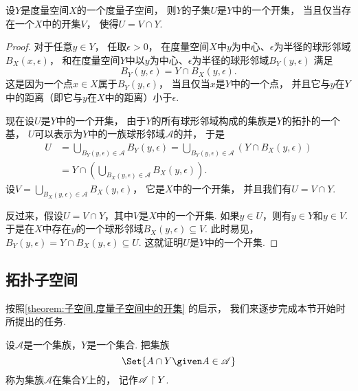 \begin{theorem}\label{theorem:子空间.度量子空间中的开集}
设\(Y\)是度量空间\(X\)的一个度量子空间，
则\(Y\)的子集\(U\)是\(Y\)中的一个开集，
当且仅当存在一个\(X\)中的开集\(V\)，
使得\(U = V \cap Y\).
\begin{proof}
对于任意\(y \in Y\)，
任取\(\epsilon>0\)，
在度量空间\(X\)中\(y\)为中心、\(\epsilon\)为半径的球形邻域\(B_X(x,\epsilon)\)，
和在度量空间\(Y\)中以\(y\)为中心、\(\epsilon\)为半径的球形邻域\(B_Y(y,\epsilon)\)
满足\begin{equation*}
	B_Y(y,\epsilon)
	= Y \cap B_X(y,\epsilon).
\end{equation*}
这是因为一个点\(x \in X\)属于\(B_Y(y,\epsilon)\)，
当且仅当\(x\)是\(Y\)中的一个点，
并且它与\(y\)在\(Y\)中的距离（即它与\(y\)在\(X\)中的距离）小于\(\epsilon\).

现在设\(U\)是\(Y\)中的一个开集，
由于\(Y\)的所有球形邻域构成的集族是\(Y\)的拓扑的一个基，
\(U\)可以表示为\(Y\)中的一族球形邻域\(\mathscr{A}\)的并，
于是\begin{align*}
	U &= \bigcup_{B_Y(y,\epsilon) \in \mathscr{A}} B_Y(y,\epsilon)
	= \bigcup_{B_Y(y,\epsilon) \in \mathscr{A}} \left( Y \cap B_X(y,\epsilon) \right) \\
	&= Y \cap \left( \bigcup_{B_X(y,\epsilon) \in \mathscr{A}} B_X(y,\epsilon) \right).
\end{align*}
设\(V = \bigcup_{B_X(y,\epsilon) \in \mathscr{A}} B_X(y,\epsilon)\)，
它是\(X\)中的一个开集，
并且我们有\(U = V \cap Y\).

反过来，假设\(U = V \cap Y\)，其中\(V\)是\(X\)中的一个开集.
如果\(y \in U\)，则有\(y \in Y\)和\(y \in V\).
于是在\(X\)中存在\(y\)的一个球形邻域\(B_X(y,\epsilon) \subseteq V\).
此时易见，\(B_Y(y,\epsilon) = Y \cap B_X(y,\epsilon) \subseteq U\).
这就证明\(U\)是\(Y\)中的一个开集.
\end{proof}
\end{theorem}

\subsection{拓扑子空间}
按照\cref{theorem:子空间.度量子空间中的开集} 的启示，
我们来逐步完成本节开始时所提出的任务.

\begin{definition}\label{definition:子空间.拓扑子空间中的集族的限制}
设\(\mathscr{A}\)是一个集族，\(Y\)是一个集合.
把集族\begin{equation*}
	\Set{ A \cap Y \given A \in \mathscr{A} }
\end{equation*}称为集族\(\mathscr{A}\)在集合\(Y\)上的，
记作\(\mathscr{A} \upharpoonright Y\).
\end{definition}

